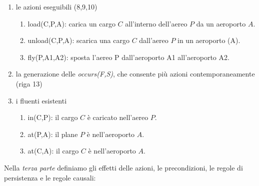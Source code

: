 \begin{enumerate}
\item le azioni eseguibili (8,9,10)
\begin{enumerate}
\item load(C,P,A): carica un cargo $C$ all'interno dell'aereo $P$ da un aeroporto $A$.
\item unload(C,P,A): scarica una cargo $C$ dall'aereo $P$ in un aeroporto (A).
\item fly(P,A1,A2): sposta l'aereo P dall'aeroporto A1 all'aeroporto A2.
\end{enumerate}

\item la generazione delle \emph{occurs(F,S)}, che consente più azioni contemporaneamente (riga 13)

\item i fluenti esistenti
\begin{enumerate}
\item in(C,P): il cargo $C$ è caricato nell'aereo $P$.
\item at(P,A): il plane $P$ è nell'aeroporto $A$.
\item at(C,A): il cargo $C$ è nell'aeroporto $A$.
\end{enumerate}
\end{enumerate}

Nella \emph{terza parte} definiamo gli effetti delle azioni, le precondizioni, le regole di persistenza e le regole causali:


